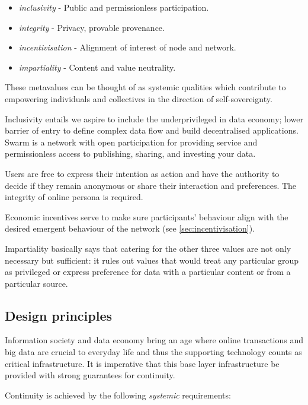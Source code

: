 \begin{itemize}
\item \emph{inclusivity} - Public and permissionless participation.  
\item \emph{integrity} - Privacy, provable provenance. 
\item \emph{incentivisation} - Alignment of interest of node and network.
\item \emph{impartiality} -  Content and value neutrality.  
\end{itemize}

These metavalues can be thought of as systemic qualities which contribute to empowering individuals and collectives in the direction of self-sovereignty.

Inclusivity entails we aspire to include the underprivileged in data economy; lower barrier of entry to define complex data flow and build decentralised applications. Swarm is a network with open participation for providing service and permissionless access to publishing, sharing, and investing your data.

Users are free to express their intention as action and have the authority to decide if they remain anonymous or share their interaction and preferences. The integrity of online persona is required. 

Economic incentives serve to make sure participants' behaviour align with the desired emergent behaviour of the network (see \ref{sec:incentivisation}). 

Impartiality basically says that catering for the other three values are not only necessary but sufficient: it rules out values that would treat any particular group as privileged or express preference for data with a particular content or from a particular source.

\subsection{Design principles \statusorange}\label{sec:design-principles}
 

Information society  and data economy bring an age where online transactions and big data are crucial to everyday life and thus the supporting technology counts as critical infrastructure. It is imperative that this base layer infrastructure be provided with strong guarantees for continuity. 

Continuity is achieved by the following \emph{systemic} requirements:

